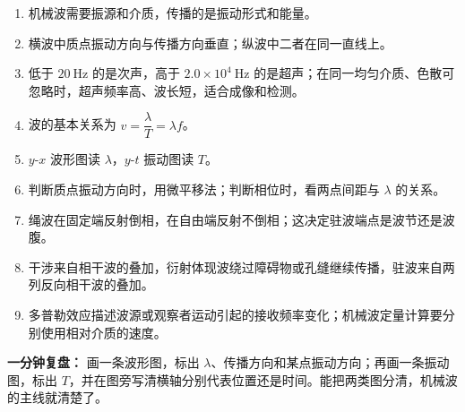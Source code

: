 \begin{enumerate}
  \item 机械波需要振源和介质，传播的是振动形式和能量。
  \item 横波中质点振动方向与传播方向垂直；纵波中二者在同一直线上。
  \item 低于 $20\ \mathrm{Hz}$ 的是次声，高于 $2.0\times10^4\ \mathrm{Hz}$ 的是超声；在同一均匀介质、色散可忽略时，超声频率高、波长短，适合成像和检测。
  \item 波的基本关系为 $v=\dfrac{\lambda}{T}=\lambda f$。
  \item $y$-$x$ 波形图读 $\lambda$，$y$-$t$ 振动图读 $T$。
  \item 判断质点振动方向时，用微平移法；判断相位时，看两点间距与 $\lambda$ 的关系。
  \item 绳波在固定端反射倒相，在自由端反射不倒相；这决定驻波端点是波节还是波腹。
  \item 干涉来自相干波的叠加，衍射体现波绕过障碍物或孔缝继续传播，驻波来自两列反向相干波的叠加。
  \item 多普勒效应描述波源或观察者运动引起的接收频率变化；机械波定量计算要分别使用相对介质的速度。
\end{enumerate}

\textbf{一分钟复盘：} 画一条波形图，标出 $\lambda$、传播方向和某点振动方向；再画一条振动图，标出 $T$，并在图旁写清横轴分别代表位置还是时间。能把两类图分清，机械波的主线就清楚了。
